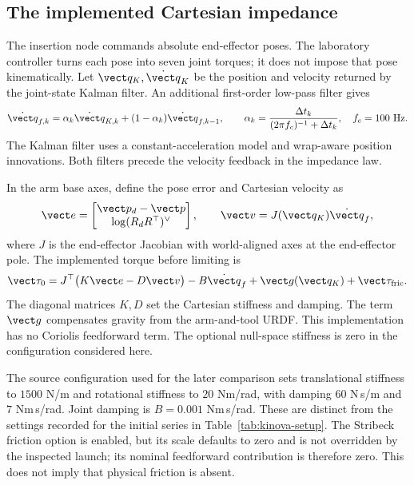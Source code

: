 \subsection{The implemented Cartesian impedance}
\label{sec:kinova-impedance}

The insertion node commands absolute end-effector poses. The laboratory controller turns each pose into seven joint torques; it does not impose that pose kinematically. Let $\vect q_K,\dot{\vect q}_K$ be the position and velocity returned by the joint-state Kalman filter. An additional first-order low-pass filter gives
\begin{equation}
\dot{\vect q}_{f,k}=\alpha_k\dot{\vect q}_{K,k}+(1-\alpha_k)\dot{\vect q}_{f,k-1},
\qquad \alpha_k=\frac{\Delta t_k}{(2\pi f_c)^{-1}+\Delta t_k},
\quad f_c=100\ \mathrm{Hz}.
\end{equation}
The Kalman filter uses a constant-acceleration model and wrap-aware position innovations. Both filters precede the velocity feedback in the impedance law.

In the arm base axes, define the pose error and Cartesian velocity as
\begin{equation}
\vect e=\begin{bmatrix}\vect p_d-\vect p\\\operatorname{log}(R_dR^\top)^\vee\end{bmatrix},
\qquad \vect v=J(\vect q_K)\dot{\vect q}_f,
\end{equation}
where $J$ is the end-effector Jacobian with world-aligned axes at the end-effector pole. The implemented torque before limiting is
\begin{equation}
\vect\tau_0=J^\top\bigl(K\vect e-D\vect v\bigr)
-B\dot{\vect q}_f+\vect g(\vect q_K)+\vect\tau_{\mathrm{fric}}.
\label{eq:kinova-impedance}
\end{equation}
The diagonal matrices $K,D$ set the Cartesian stiffness and damping. The term $\vect g$ compensates gravity from the arm-and-tool URDF. This implementation has no Coriolis feedforward term. The optional null-space stiffness is zero in the configuration considered here.

The source configuration used for the later comparison sets translational stiffness to $1500$ N/m and rotational stiffness to $20$ Nm/rad, with damping $60$ N\,s/m and $7$ Nm\,s/rad. Joint damping is $B=0.001$ Nm\,s/rad. These are distinct from the settings recorded for the initial series in Table~\ref{tab:kinova-setup}. The Stribeck friction option is enabled, but its scale defaults to zero and is not overridden by the inspected launch; its nominal feedforward contribution is therefore zero. This does not imply that physical friction is absent.

